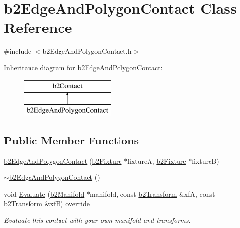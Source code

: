 \hypertarget{classb2_edge_and_polygon_contact}{}\section{b2\+Edge\+And\+Polygon\+Contact Class Reference}
\label{classb2_edge_and_polygon_contact}


{\ttfamily \#include $<$b2\+Edge\+And\+Polygon\+Contact.\+h$>$}

Inheritance diagram for b2\+Edge\+And\+Polygon\+Contact\+:\begin{figure}[H]
\begin{center}
\leavevmode
\includegraphics[height=2.000000cm]{classb2_edge_and_polygon_contact}
\end{center}
\end{figure}
\subsection*{Public Member Functions}
\begin{DoxyCompactItemize}
\item 
\mbox{\hyperlink{classb2_edge_and_polygon_contact_a79d9b012c4a0df7d5c3dcecd33df7d5f}{b2\+Edge\+And\+Polygon\+Contact}} (\mbox{\hyperlink{classb2_fixture}{b2\+Fixture}} $\ast$fixtureA, \mbox{\hyperlink{classb2_fixture}{b2\+Fixture}} $\ast$fixtureB)
\item 
\mbox{\hyperlink{classb2_edge_and_polygon_contact_a7e9060b470a46edaeb0d7f87a09e658a}{$\sim$b2\+Edge\+And\+Polygon\+Contact}} ()
\item 
void \mbox{\hyperlink{classb2_edge_and_polygon_contact_ae99fba8c1cb7e5d7c11ab78ca80e775d}{Evaluate}} (\mbox{\hyperlink{structb2_manifold}{b2\+Manifold}} $\ast$manifold, const \mbox{\hyperlink{structb2_transform}{b2\+Transform}} \&xfA, const \mbox{\hyperlink{structb2_transform}{b2\+Transform}} \&xfB) override
\begin{DoxyCompactList}\small\item\em Evaluate this contact with your own manifold and transforms. \end{DoxyCompactList}\end{DoxyCompactItemize}
